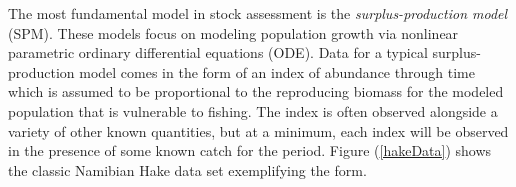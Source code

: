 \documentclass[12pt]{ucscthesis}
\begin{document}
%
%
%
%
%
%
%
%



The most fundamental model in stock assessment is the {\it surplus-production
model} (SPM). These models focus on modeling population growth via nonlinear
parametric ordinary differential equations (ODE).
Data for a typical surplus-production model comes in the form of an index
of abundance through time which is assumed to be proportional to the reproducing
biomass for the modeled population that is vulnerable to fishing. The index
is often observed alongside a variety of other known quantities, but at a
minimum, each index will be observed in the presence of some known catch for
the period. Figure (\ref{hakeData}) shows the classic Namibian Hake data set
\cite{punt_model_1988, hilborn_ecological_1997, mangel_theoretical_2006}
exemplifying the form.
\end{document}
